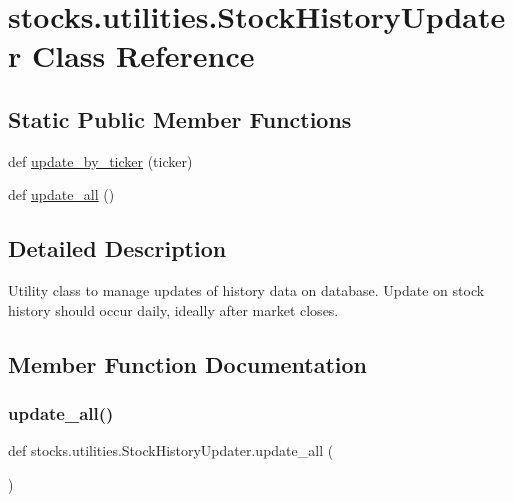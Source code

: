 \hypertarget{classstocks_1_1utilities_1_1_stock_history_updater}{}\section{stocks.\+utilities.\+Stock\+History\+Updater Class Reference}
\label{classstocks_1_1utilities_1_1_stock_history_updater}
\subsection*{Static Public Member Functions}
\begin{DoxyCompactItemize}
\item 
def \mbox{\hyperlink{classstocks_1_1utilities_1_1_stock_history_updater_aa943ba0956fc5af74f69a32416d4246f}{update\+\_\+by\+\_\+ticker}} (ticker)
\item 
def \mbox{\hyperlink{classstocks_1_1utilities_1_1_stock_history_updater_ac26ce6122903a501fbc6144fe9808fed}{update\+\_\+all}} ()
\end{DoxyCompactItemize}


\subsection{Detailed Description}
\begin{DoxyVerb}Utility class to manage updates of history data on database.
Update on stock history should occur daily,
ideally after market closes.
\end{DoxyVerb}
 

\subsection{Member Function Documentation}
\mbox{\label{classstocks_1_1utilities_1_1_stock_history_updater_ac26ce6122903a501fbc6144fe9808fed}} 
\subsubsection{\texorpdfstring{update\+\_\+all()}{update\_all()}}
{\footnotesize\ttfamily def stocks.\+utilities.\+Stock\+History\+Updater.\+update\+\_\+all (\begin{DoxyParamCaption}{ }\end{DoxyParamCaption})\hspace{0.3cm}{\ttfamily [static]}}

